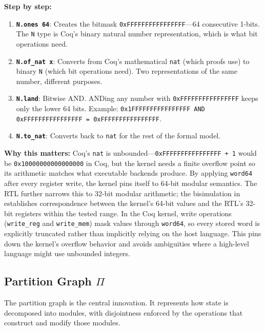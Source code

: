 \textbf{Step by step:}
\begin{enumerate}
    \item \textbf{\texttt{N.ones 64}}: Creates the bitmask \texttt{0xFFFFFFFFFFFFFFFF}---64 consecutive 1-bits. The \texttt{N} type is Coq's binary natural number representation, which is what bit operations need.
    \item \textbf{\texttt{N.of\_nat x}}: Converts from Coq's mathematical \texttt{nat} (which proofs use) to binary \texttt{N} (which bit operations need). Two representations of the same number, different purposes.
    \item \textbf{\texttt{N.land}}: Bitwise AND. ANDing any number with \texttt{0xFFFFFFFFFFFFFFFF} keeps only the lower 64 bits. Example: \texttt{0x1FFFFFFFFFFFFFFFF AND 0xFFFFFFFFFFFFFFFF = 0xFFFFFFFFFFFFFFFF}.
    \item \textbf{\texttt{N.to\_nat}}: Converts back to \texttt{nat} for the rest of the formal model.
\end{enumerate}

\textbf{Why this matters:} Coq's \texttt{nat} is unbounded---\texttt{0xFFFFFFFFFFFFFFFF + 1} would be \texttt{0x10000000000000000} in Coq, but the kernel needs a finite overflow point so its arithmetic matches what executable backends produce. By applying \texttt{word64} after every register write, the kernel pins itself to 64-bit modular semantics. The RTL further narrows this to 32-bit modular arithmetic; the bisimulation in  establishes correspondence between the kernel's 64-bit values and the RTL's 32-bit registers within the tested range.
In the Coq kernel, write operations (\texttt{write\_reg} and \texttt{write\_mem}) mask values through \texttt{word64}, so every stored word is explicitly truncated rather than implicitly relying on the host language. This pins down the kernel's overflow behavior and avoids ambiguities where a high-level language might use unbounded integers.

\subsection{Partition Graph $\Pi$}

The partition graph is the central innovation. It represents how state is decomposed into modules, with disjointness enforced by the operations that construct and modify those modules.

